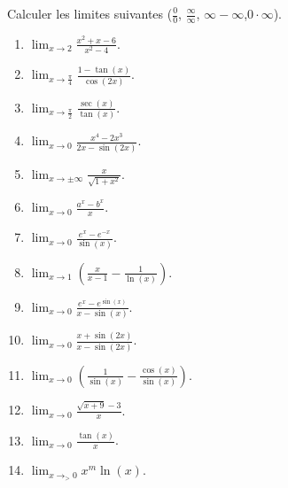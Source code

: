 \begin{exercice}\label{exoGeneral0010}

Calculer les limites suivantes ($\frac{ 0 }{ 0 }$, $\frac{ \infty }{ \infty }$, $\infty-\infty$,$0\cdot\infty$).
\begin{multicols}{2}
	
\begin{enumerate}

\item
$\lim_{x\to 2} \frac{ x^2+x-6 }{ x^2-4 }$.

\item
$\lim_{x\to \frac{ \pi }{ 4 }} \frac{ 1-\tan(x)}{\cos(2x)}$.

\item
$\lim_{x\to \frac{ \pi }{ 2 }} \frac{ \sec(x) }{ \tan(x) }$.

\item
$\lim_{x\to 0} \frac{ x^4-2x^3 }{ 2x-\sin(2x) }$.

\item
$\lim_{x\to \pm\infty} \frac{ x }{ \sqrt{1+x^2} }$.

\item
$\lim_{x\to 0} \frac{ a^x-b^x }{ x }$. 

\item
$\lim_{x\to 0} \frac{ e^x-e^{-x} }{ \sin(x) }$.

\item
$\lim_{x\to 1} \left( \frac{ x }{ x-1 }-\frac{1}{ \ln(x) } \right)$.


\item
$\lim_{x\to 0} \frac{ e^x-e^{\sin(x)} }{ x-\sin(x) }$.


\item
$\lim_{x\to 0} \frac{ x+\sin(2x) }{ x-\sin(2x) }$.



\item
$\lim_{x\to 0}\left( \frac{1}{ \sin(x) }-\frac{ \cos(x) }{ \sin(x) } \right)$.



\item
$\lim_{x\to 0} \frac{ \sqrt{x+9}-3 }{ x }$.



\item
$\lim_{x\to 0} \frac{ \tan(x) }{ x }$.


\item
$\lim_{x\to_{>} 0} x^m\ln(x)$.




\end{enumerate}
\end{multicols}
\end{exercice}
